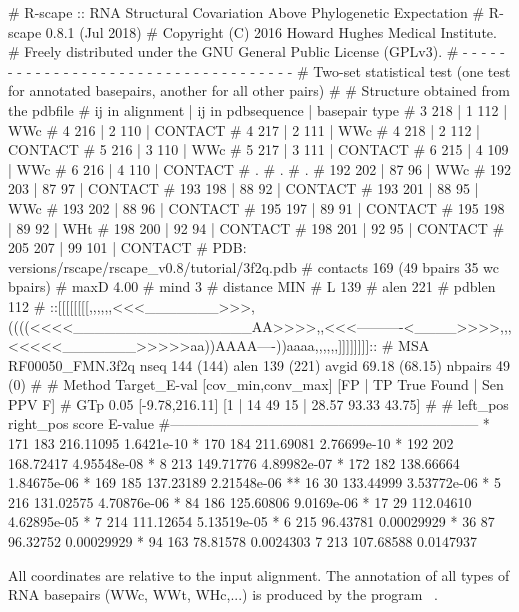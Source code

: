 \begin{sreoutput}
# R-scape :: RNA Structural Covariation Above Phylogenetic Expectation
# R-scape 0.8.1 (Jul 2018)
# Copyright (C) 2016 Howard Hughes Medical Institute.
# Freely distributed under the GNU General Public License (GPLv3).
# - - - - - - - - - - - - - - - - - - - - - - - - - - - - - - - - - - - -
# Two-set statistical test (one test for annotated basepairs, another for all other pairs)
#
# Structure obtained from the pdbfile
# ij in alignment | ij in pdbsequence | basepair type
# 3 218 | 1 112 | WWc
# 4 216 | 2 110 | CONTACT
# 4 217 | 2 111 | WWc
# 4 218 | 2 112 | CONTACT
# 5 216 | 3 110 | WWc
# 5 217 | 3 111 | CONTACT
# 6 215 | 4 109 | WWc
# 6 216 | 4 110 | CONTACT
# .
# .
# .
# 192 202 | 87 96 | WWc
# 192 203 | 87 97 | CONTACT
# 193 198 | 88 92 | CONTACT
# 193 201 | 88 95 | WWc
# 193 202 | 88 96 | CONTACT
# 195 197 | 89 91 | CONTACT
# 195 198 | 89 92 | WHt
# 198 200 | 92 94 | CONTACT
# 198 201 | 92 95 | CONTACT
# 205 207 | 99 101 | CONTACT
# PDB:      versions/rscape/rscape_v0.8/tutorial/3f2q.pdb
# contacts  169 (49 bpairs 35 wc bpairs)
# maxD      4.00
# mind      3
# distance  MIN
# L         139
# alen      221
# pdblen    112
# ::[[[[[[[[,,,,,,<<<_______>>>,((((<<<<_________________AA>>>>,,<<<----------<____>>>>,,,<<<<<_______>>>>>aa))AAAA----))aaaa,,,,,,]]]]]]]]::
# MSA RF00050_FMN.3f2q nseq 144 (144) alen 139 (221) avgid 69.18 (68.15) nbpairs 49 (0)
#
# Method Target_E-val [cov_min,conv_max] [FP | TP True Found | Sen PPV F] 
# GTp    0.05         [-9.78,216.11]     [1 | 14 49 15 | 28.57 93.33 43.75] 
#
#       left_pos       right_pos        score           E-value
#------------------------------------------------------------------
*	     171	     183	216.11095	1.6421e-10
*	     170	     184	211.69081	2.76699e-10
*	     192	     202	168.72417	4.95548e-08
*	       8	     213	149.71776	4.89982e-07
*	     172	     182	138.66664	1.84675e-06
*	     169	     185	137.23189	2.21548e-06
**	      16	      30	133.44999	3.53772e-06
*	       5	     216	131.02575	4.70876e-06
*	      84	     186	125.60806	9.0169e-06
*	      17	      29	112.04610	4.62895e-05
*	       7	     214	111.12654	5.13519e-05
*	       6	     215	96.43781	0.00029929
*	      36	      87	96.32752	0.00029929
*	      94	     163	78.81578	0.0024303
 	       7	     213	107.68588	0.0147937
\end{sreoutput}

\noindent
All coordinates are relative to the input alignment. The annotation of
all types of RNA basepairs (WWc, WWt, WHc,...) is produced by the
program ~\citep{YangWesthof03}.


